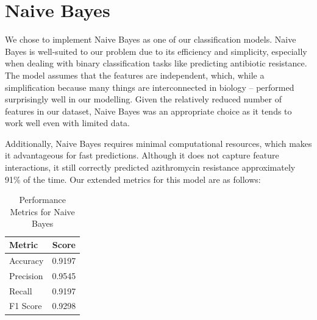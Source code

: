 \documentclass[manuscript,screen,review, nonacm]{acmart}
\begin{document}
  \section*{Naive Bayes}


    We chose to implement Naive Bayes as one of our classification models. 
    Naive Bayes is well-suited to our problem due to its efficiency and simplicity, 
    especially when dealing with binary classification tasks like predicting antibiotic 
    resistance. The model assumes that the features are independent, which, while a 
    simplification because many things are interconnected in biology -- performed surprisingly 
    well in our modelling.  Given the relatively reduced number of features in our dataset, 
    Naive Bayes was an appropriate choice as it tends to work well even with limited data.

    Additionally, Naive Bayes requires minimal computational resources, 
    which makes it advantageous for fast predictions. Although it does not capture 
    feature interactions, it still correctly predicted azithromycin resistance approximately 91\% of the time. 
    Our extended metrics for this model are as follows:

  \begin{table}[H]
    \centering
    \begin{tabular}{@{}lc@{}}
        \toprule
        \textbf{Metric} & \textbf{Score} \\ \midrule
        Accuracy  & 0.9197 \\
        Precision & 0.9545 \\
        Recall    & 0.9197 \\
        F1 Score  & 0.9298 \\ \bottomrule
    \end{tabular}
    \caption{Performance Metrics for Naive Bayes}

\end{table}
  
\end{document}
